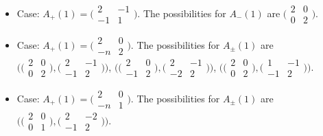 \documentclass[10pt,a4paper]{amsart}
\numberwithin{equation}{section}
\theoremstyle{definition}
\begin{document}
\begin{itemize}
\item Case: $A_+(1) =
 \bigl(\begin{smallmatrix}
 2 & -1 \\
 -1 & 1
\end{smallmatrix}\bigr)$.
 The possibilities for $A_-(1)$ are $\bigl(\begin{smallmatrix}
 2 & 0 \\
 0 & 2
\end{smallmatrix}\bigr)$.

\item Case: $A_+(1) =
 \bigl(\!\begin{smallmatrix}
 2 & 0 \\
 -n & 2
\end{smallmatrix}\bigr)$.
 The possibilities for $A_\pm(1)$ are
$
\bigl(\bigl(\begin{smallmatrix}
 2 & 0 \\
 0 & 2
\end{smallmatrix}\bigr),
\bigl(\!\begin{smallmatrix}
 2 & -1 \\
 -1 & 2
 \end{smallmatrix}\bigr)\bigr)$, $
\bigl(\bigl(\begin{smallmatrix}
 2 & 0 \\
 -1 & 2
\end{smallmatrix}\bigr),
\bigl(\!\begin{smallmatrix}
 2 & -1 \\
 -2 & 2
 \end{smallmatrix}\bigr)\bigr)$, $
\bigl(\bigl(\begin{smallmatrix}
 2 & 0 \\
 0 & 2
\end{smallmatrix}\bigr),
\bigl(\begin{smallmatrix}
 1 & -1 \\
 -1 & 2
 \end{smallmatrix}\bigr)\bigr)$.

\item Case: $A_+(1) =
\bigl(\begin{smallmatrix}
 2 & 0 \\
 -n & 1
\end{smallmatrix}\bigr)$.
 The possibilities for $A_\pm(1)$ are
$\bigl( \bigl(\begin{smallmatrix}
 2 & 0 \\
 0 & 1
 \end{smallmatrix}\bigr),
\bigl(\begin{smallmatrix}
 2 & -2 \\
 -1 & 2
 \end{smallmatrix}\bigr)\bigr)$.


\end{itemize}
\end{document}

